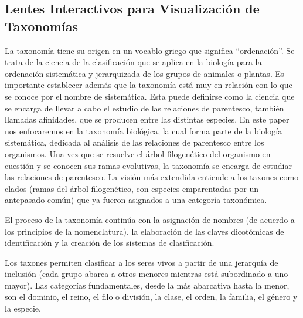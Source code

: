 \documentclass[journal]{IEEEtran}
\begin{document}
 \subsection{Lentes Interactivos para Visualización de Taxonomías}
 La taxonomía tiene su origen en un vocablo griego que significa “ordenación”. Se trata de la ciencia de la clasificación que se aplica en la biología para la ordenación sistemática y jerarquizada de los grupos de animales o plantas.
 Es importante establecer además que la taxonomía está muy en relación con lo que se conoce por el nombre de sistemática. Esta puede definirse como la ciencia que se encarga de llevar a cabo el estudio de las relaciones de parentesco, también llamadas afinidades, 
 que se producen entre las distintas especies.
 En este paper nos enfocaremos en la taxonomía biológica, la cual forma parte de la biología sistemática, dedicada al análisis de las relaciones de parentesco entre los organismos. Una vez que se resuelve el árbol filogenético del organismo en cuestión y se conocen sus ramas evolutivas, 
 la taxonomía se encarga de estudiar las relaciones de parentesco.
 La visión más extendida entiende a los taxones como clados (ramas del árbol filogenético, con especies emparentadas por un antepasado común) que ya fueron asignados a una categoría taxonómica.

El proceso de la taxonomía continúa con la asignación de nombres (de acuerdo a los principios de la nomenclatura), la elaboración de las claves dicotómicas de identificación y la creación de los sistemas de clasificación.

Los taxones permiten clasificar a los seres vivos a partir de una jerarquía de inclusión (cada grupo abarca a otros menores mientras está subordinado a uno mayor). Las categorías fundamentales, desde la más abarcativa hasta la menor, son el 
dominio, el reino, el filo o división, la clase, el orden, la familia, el género y la especie.
\end{document}
